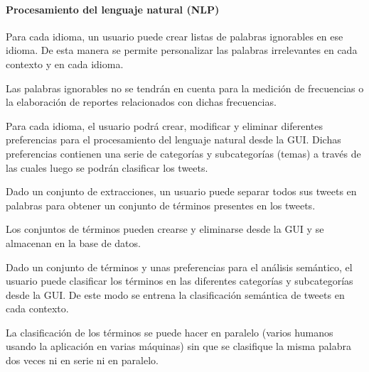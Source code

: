 \begin{functional}
\paragraph{Procesamiento del lenguaje natural (NLP)}
\item Para cada idioma, un usuario puede crear listas de palabras ignorables en ese idioma. De esta manera se permite personalizar las palabras irrelevantes en cada contexto y en cada idioma.
\item Las palabras ignorables no se tendrán en cuenta para la medición de frecuencias o la elaboración de reportes relacionados con dichas frecuencias.
\item Para cada idioma, el usuario podrá crear, modificar y eliminar diferentes preferencias para el procesamiento del lenguaje natural desde la GUI. Dichas preferencias contienen una serie de categorías y subcategorías (temas) a través de las cuales luego se podrán clasificar los tweets.
\item Dado un conjunto de extracciones, un usuario puede separar todos sus tweets en palabras para obtener un conjunto de términos presentes en los tweets.
\item Los conjuntos de términos pueden crearse y eliminarse desde la GUI y se almacenan en la base de datos.
\item Dado un conjunto de términos y unas preferencias para el análisis semántico, el usuario puede clasificar los términos en las diferentes categorías y subcategorías desde la GUI. De este modo se entrena la clasificación semántica de tweets en cada contexto.
\item La clasificación de los términos se puede hacer en paralelo (varios humanos usando la aplicación en varias máquinas) sin que se clasifique la misma palabra dos veces ni en serie ni en paralelo.


\end{functional}
